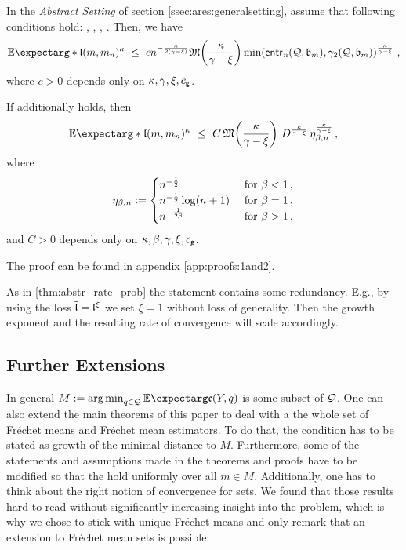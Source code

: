 \begin{theorem}\label{thm:abstr_rate_exp}
	In the \textit{Abstract Setting} of section \ref{ssec:ares:generalsetting}, assume that following conditions hold:
	, , , .
	Then, we have
	\begin{equation*}
		\Ex*{\mf l(m ,m_n)^\kappa}
		\ \leq \ 
		c n^{-\frac{\kappa}{2(\gamma-\xi)}} \mf M\brOf{\frac{\kappa}{\gamma-\xi}} \min\brOf{\entrn(\mc Q, \mf b_m), \gamma_2(\mc Q, \mf b_m)}^{\frac{\kappa}{\gamma-\xi}}
		\eqcm
	\end{equation*}
	where $c>0$ depends only on $\kappa,\gamma,\xi,c_{\mathsf{g}}$.
	
	If additionally  holds, then
	\begin{equation*}
		\Ex*{\mf l(m ,m_n)^\kappa}
		\ \leq \
		C \, \mf M\brOf{\frac{\kappa}{\gamma-\xi}} \,  D^{\frac{\kappa}{\gamma-\xi}} \,  \eta_{\beta,n}^{\frac{\kappa}{\gamma-\xi}}
		\eqcm
	\end{equation*}
	where 
	\begin{equation*}
		\eta_{\beta,n} := 
		\begin{cases} 
			n^{-\frac12} & \text{ for }\beta < 1\, ,\\
			n^{-\frac12} \log(n+1) & \text{ for } \beta = 1\, ,\\
			n^{-\frac1{2\beta}} & \text{ for } \beta > 1\, ,
		\end{cases} 
	\end{equation*}
	and $C>0$ depends only on $\kappa,\beta,\gamma,\xi,c_{\mathsf{g}}$.
\end{theorem}
The proof can be found in appendix \autoref{app:proofs:1and2}.

As in \autoref{thm:abstr_rate_prob} the statement contains some redundancy. E.g., by using the loss $\tilde {\mathfrak{l}} = \mathfrak{l}^\xi$ we set $\xi=1$ without loss of generality. Then the growth exponent and the resulting rate of convergence will scale accordingly.
%
%
%
%
%
\subsection{Further Extensions}\label{ssec:ares:extensions}
%
In general $M := \argmin_{q\in\mc Q} \Ex{\mf c(Y, q)}$ is some subset of $\mathcal{Q}$. One can also extend the main theorems of this paper to deal with a the whole set of Fréchet means and Fréchet mean estimators. To do that, the  condition has to be stated as growth of the minimal distance to $M$. Furthermore, some of the statements and assumptions made in the theorems and proofs have to be modified so that the hold uniformly over all $m\in M$. Additionally, one has to think about the right notion of convergence for sets. We found that those results hard to read without significantly increasing insight into the problem, which is why we chose to stick with unique Fréchet means and only remark that an extension to Fréchet mean sets is possible.

